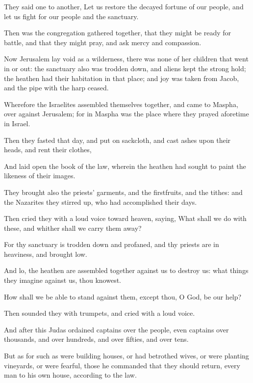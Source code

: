 {\par }{\PP {}They said one to another, Let us restore the decayed fortune of our people, and let us fight for our people and the sanctuary.
\par }{\PP {}Then was the congregation gathered together, that they might be ready for battle, and that they might pray, and ask mercy and compassion.
\par }{\PP {}Now Jerusalem lay void as a wilderness, there was none of her children that went in or out: the sanctuary also was trodden down, and aliens kept the strong hold; the heathen had their habitation in that place; and joy was taken from Jacob, and the pipe with the harp ceased.
\par }{\PP {}Wherefore the Israelites assembled themselves together, and came to Maspha, over against Jerusalem; for in Maspha was the place where they prayed aforetime in Israel.
\par }{\PP {}Then they fasted that day, and put on sackcloth, and cast ashes upon their heads, and rent their clothes,
\par }{\PP {}And laid open the book of the law, wherein the heathen had sought to paint the likeness of their images.
\par }{\PP {}They brought also the priests’ garments, and the firstfruits, and the tithes: and the Nazarites they stirred up, who had accomplished their days.
\par }{\PP {}Then cried they with a loud voice toward heaven, saying, What shall we do with these, and whither shall we carry them away?
\par }{\PP {}For thy sanctuary is trodden down and profaned, and thy priests are in heaviness, and brought low.
\par }{\PP {}And lo, the heathen are assembled together against us to destroy us: what things they imagine against us, thou knowest.
\par }{\PP {}How shall we be able to stand against them, except thou, O God, be our help?
\par }{\PP {}Then sounded they with trumpets, and cried with a loud voice.
\par }{\PP {}And after this Judas ordained captains over the people, even captains over thousands, and over hundreds, and over fifties, and over tens.
\par }{\PP {}But as for such as were building houses, or had betrothed wives, or were planting vineyards, or were fearful, those he commanded that they should return, every man to his own house, according to the law.
}
